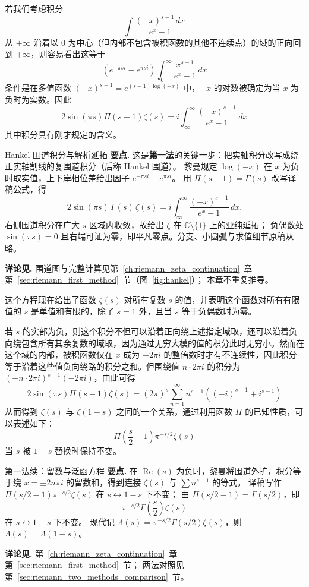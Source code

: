 若我们考虑积分
\[
\int \frac{(-x)^{s-1} \, dx}{e^x - 1}
\]
从 $+\infty$ 沿着以 0 为中心（但内部不包含被积函数的其他不连续点）的域的正向回到 $+\infty$，则容易看出这等于
\[
(e^{-\pi si} - e^{\pi si}) \int_0^{\infty} \frac{x^{s-1}}{e^x - 1} \, dx
\]
条件是在多值函数 $(-x)^{s-1} = e^{(s-1)\log(-x)}$ 中，$-x$ 的对数被确定为当 $x$ 为负时为实数。因此
\[
2\sin(\pi s) \Pi(s-1) \zeta(s) = i \int_{\infty}^{\infty} \frac{(-x)^{s-1}}{e^x - 1} \, dx
\]
其中积分具有刚才规定的含义。

\begin{commentary}{Hankel 围道积分与解析延拓}
\textbf{要点.}
这是\textbf{第一法}的关键一步：把实轴积分改写成绕正实轴割线的复围道积分（后称 Hankel 围道）。
黎曼规定 $\log(-x)$ 在 $x$ 为负时取实值，上下岸相位差给出因子 $e^{-\pi si}-e^{\pi si}$。
用 $\Pi(s-1)=\Gamma(s)$ 改写译稿公式，得
\[
2\sin(\pi s)\,\Gamma(s)\,\zeta(s)
=i\int_{\infty}^{\infty}\frac{(-x)^{s-1}}{e^x-1}\,dx.
\]
右侧围道积分在广大 $s$ 区域内收敛，故给出 $\zeta$ 在 $\mathbb{C}\setminus\{1\}$ 上的亚纯延拓；
负偶数处 $\sin(\pi s)=0$ 且右端可证为零，即平凡零点。分支、小圆弧与求值细节原稿从略。

\textbf{详论见.}
围道图与完整计算见第~\ref{ch:riemann_zeta_continuation}~章第~\ref{sec:riemann_first_method}~节（图~\ref{fig:hankel}）；
本章不重复推导。
\end{commentary}

这个方程现在给出了函数 $\zeta(s)$ 对所有复数 $s$ 的值，并表明这个函数对所有有限值的 $s$ 是单值和有限的，除了 $s = 1$ 外，且当 $s$ 等于负偶数时为零。

若 $s$ 的实部为负，则这个积分不但可以沿着正向绕上述指定域取，还可以沿着负向绕包含所有其余复数的域取，因为通过无穷大模的值的积分此时无穷小。然而在这个域的内部，被积函数仅在 $x$ 成为 $\pm 2\pi i$ 的整倍数时才有不连续性，因此积分等于沿着这些值负向绕路的积分之和。但围绕值 $n \cdot 2\pi i$ 的积分为 $(-n \cdot 2\pi i)^{s-1}(-2\pi i)$，由此可得
\[
2\sin(\pi s) \Pi(s-1) \zeta(s) = (2\pi)^s \sum_{n=1}^{\infty} n^{s-1} \left((-i)^{s-1} + i^{s-1}\right)
\]
从而得到 $\zeta(s)$ 与 $\zeta(1-s)$ 之间的一个关系，通过利用函数 $\Pi$ 的已知性质，可以表述如下：
\[
\Pi\left(\frac{s}{2} - 1\right) \pi^{-s/2} \zeta(s)
\]
当 $s$ 被 $1-s$ 替换时保持不变。

\begin{commentary}{第一法续：留数与泛函方程}
\textbf{要点.}
在 $\operatorname{Re}(s)$ 为负时，黎曼将围道外扩，积分等于绕 $x=\pm 2n\pi i$ 的留数和，得到连接 $\zeta(s)$ 与 $\sum n^{s-1}$ 的等式。
译稿写作 $\Pi(s/2-1)\pi^{-s/2}\zeta(s)$ 在 $s\leftrightarrow 1-s$ 下不变；
由 $\Pi(s/2-1)=\Gamma(s/2)$，即
\[
\pi^{-s/2}\Gamma\!\left(\frac{s}{2}\right)\zeta(s)
\]
在 $s\leftrightarrow 1-s$ 下不变。
现代记 $\Lambda(s)=\pi^{-s/2}\Gamma(s/2)\zeta(s)$，则 $\Lambda(s)=\Lambda(1-s)$。

\textbf{详论见.}
第~\ref{ch:riemann_zeta_continuation}~章第~\ref{sec:riemann_first_method}~节；
两法对照见第~\ref{sec:riemann_two_methods_comparison}~节。
\end{commentary}

